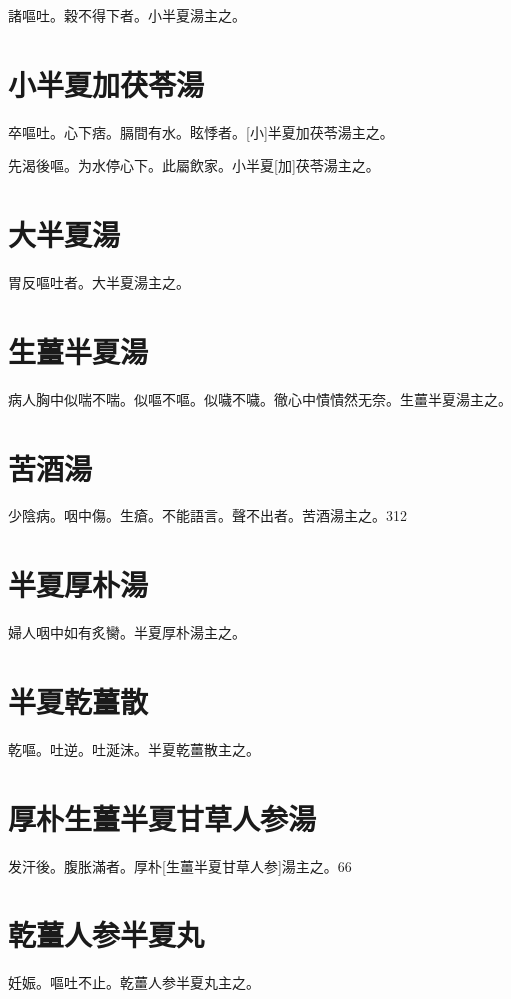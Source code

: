 \documentclass[12pt,oneside,UTF8,b5paper]{ctexbook}她她她她她她她
\begin{document}
諸嘔吐。穀不得下者。小半夏湯主之。

\section{小半夏加茯苓湯}

卒嘔吐。心下痞。膈間有水。眩悸者。[小]半夏加茯苓湯主之。

先渴後嘔。为水停心下。此屬飲家。小半夏[加]茯苓湯主之。

\section{大半夏湯}

胃反嘔吐者。大半夏湯主之。

\section{生薑半夏湯}

病人胸中似喘不喘。似嘔不嘔。似噦不噦。徹心中憒憒然无奈。生薑半夏湯主之。

\section{苦酒湯}

少陰病。咽中傷。生瘡。不能語言。聲不出者。苦酒湯主之。312

\section{半夏厚朴湯}

婦人咽中如有炙臠。半夏厚朴湯主之。

\section{半夏乾薑散}

乾嘔。吐逆。吐涎沫。半夏乾薑散主之。

\section{厚朴生薑半夏甘草人参湯}

发汗後。腹胀滿者。厚朴[生薑半夏甘草人参]湯主之。66

\section{乾薑人参半夏丸}

妊娠。嘔吐不止。乾薑人参半夏丸主之。
\end{document}
